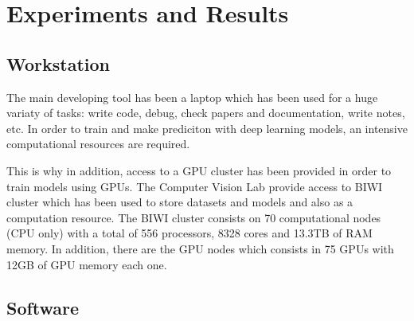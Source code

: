 
%
\newpage
\chapter{Experiments and Results}

\section{Workstation}

The main developing tool has been a laptop which has been used for a huge variaty of tasks: write code, debug, check papers and documentation, write notes, etc.
In order to train and make prediciton with deep learning models, an intensive computational resources are required.

This is why in addition, access to a GPU cluster has been provided in order to train models using GPUs.
The Computer Vision Lab provide access to BIWI cluster which has been used to store datasets and models and also as a computation resource. The BIWI cluster consists on 70 computational nodes (CPU only) with a total of 556 processors, 8328 cores and 13.3TB of RAM memory.
In addition, there are the GPU nodes which consists in 75 GPUs with 12GB of GPU memory each one.

\section{Software}

